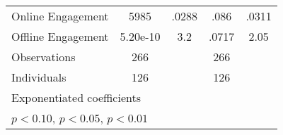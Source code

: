 \begin{table}[htbp]
\begin{tabular}{l*{4}{c}}
\hspace{0.25cm} Online Engagement&      5985        &     .0288\sym{*} &      .086        &     .0311\sym{^+}\\
\hspace{0.25cm} Offline Engagement&  5.20e-10        &       3.2        &     .0717        &      2.05        \\
\midrule
Observations                  &       266        &                  &       266        &                  \\
Individuals                   &       126        &                  &       126        &                  \\
\bottomrule
\multicolumn{5}{l}{\footnotesize Exponentiated coefficients}\\
\multicolumn{5}{l}{\footnotesize \sym{^+} \(p<0.10\), \sym{*} \(p<0.05\), \sym{**} \(p<0.01\)}\\
\end{tabular}
\end{table}
